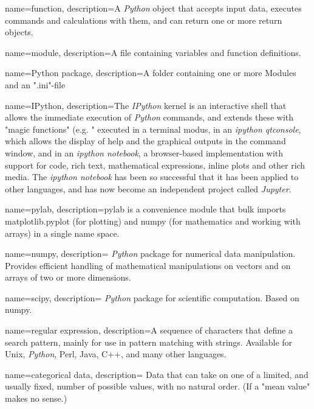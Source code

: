 \makeglossaries

{
    name=function,
    description={A \emph{Python} object that accepts input data, executes commands and
    calculations with them, and can return one or more return objects.}
}

{
    name=module,
    description={A file containing variables and function definitions.}
}

{
    name=Python package,
    description={A folder containing one or more Modules and an ".ini"-file}
}

{
    name=IPython,
    description={The \emph{IPython} kernel is an interactive shell that allows the immediate
    execution of \emph{Python} commands, and extends these with "magic functions"
    (e.g. "%
    executed in a terminal modus, in an \emph{ipython qtconsole}, which allows the display of
    help and the graphical outputs in the command window, and in an \emph{ipython notebook},
    a browser-based implementation with support for code, rich text,
    mathematical expressions, inline plots and other rich media. The
    \emph{ipython notebook} has been so successful that it has been applied to other
    languages, and has now become an independent project called \emph{Jupyter}.}
}

{
    name=pylab,
    description={pylab is a convenience module that bulk imports matplotlib.pyplot (for
    plotting) and numpy (for mathematics and working with arrays) in a single
    name space.}
}

{
    name=numpy,
    description={ \emph{Python} package for numerical data manipulation. Provides efficient
    handling of mathematical manipulations on vectors and on arrays of two or
    more dimensions.}
}

{
    name=scipy,
    description={ \emph{Python} package for scientific computation. Based on numpy.}
}

{
    name=regular expression,
    description={A sequence of characters that define a search pattern, mainly for use in
    pattern matching with strings. Available for Unix, \emph{Python}, Perl, Java, C++, and many other
    languages.}
}

{
    name=categorical data,
    description={ Data that can take on one of a limited, and usually fixed, number of
    possible values, with no natural order. (If a "mean value" makes no
    sense.)}
}


